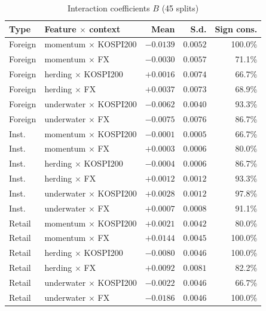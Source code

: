 \begin{table}[htbp]
  \caption{Interaction coefficients $B$ (45 splits)}
  \label{tab:interactions}
  \small
  \centering
  \begin{tabular}{@{}llrrr@{}}
    \toprule
    Type & Feature $\times$ context & Mean & S.d. & Sign cons. \\
    \midrule
    Foreign & momentum $\times$ KOSPI200 & $-0.0139$ & $0.0052$ & 100.0\% \\
    Foreign & momentum $\times$ FX       & $-0.0030$ & $0.0057$ & 71.1\% \\
    Foreign & herding $\times$ KOSPI200  & $+0.0016$ & $0.0074$ & 66.7\% \\
    Foreign & herding $\times$ FX        & $+0.0037$ & $0.0073$ & 68.9\% \\
    Foreign & underwater $\times$ KOSPI200 & $-0.0062$ & $0.0040$ & 93.3\% \\
    Foreign & underwater $\times$ FX     & $-0.0075$ & $0.0076$ & 86.7\% \\
    \addlinespace
    Inst. & momentum $\times$ KOSPI200 & $-0.0001$ & $0.0005$ & 66.7\% \\
    Inst. & momentum $\times$ FX       & $+0.0003$ & $0.0006$ & 80.0\% \\
    Inst. & herding $\times$ KOSPI200  & $-0.0004$ & $0.0006$ & 86.7\% \\
    Inst. & herding $\times$ FX        & $+0.0012$ & $0.0012$ & 93.3\% \\
    Inst. & underwater $\times$ KOSPI200 & $+0.0028$ & $0.0012$ & 97.8\% \\
    Inst. & underwater $\times$ FX     & $+0.0007$ & $0.0008$ & 91.1\% \\
    \addlinespace
    Retail & momentum $\times$ KOSPI200 & $+0.0021$ & $0.0042$ & 80.0\% \\
    Retail & momentum $\times$ FX       & $+0.0144$ & $0.0045$ & 100.0\% \\
    Retail & herding $\times$ KOSPI200  & $-0.0080$ & $0.0046$ & 100.0\% \\
    Retail & herding $\times$ FX        & $+0.0092$ & $0.0081$ & 82.2\% \\
    Retail & underwater $\times$ KOSPI200 & $-0.0022$ & $0.0046$ & 66.7\% \\
    Retail & underwater $\times$ FX     & $-0.0186$ & $0.0046$ & 100.0\% \\
    \bottomrule
  \end{tabular}
\end{table}

